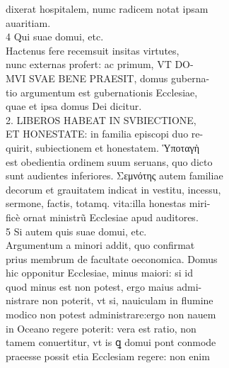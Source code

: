 \documentclass{article}
\begin{document}
\begin{pages}
                dixerat hospitalem, numc radicem notat ipsam \\
                auaritiam. \\
                4 Qui suae domui, etc. \\
                Hactenus fere recemsuit insitas virtutes, \\
                nunc externas profert: ac primum, VT DO- \\
                MVI SVAE BENE PRAESIT, domus guberna- \\
                tio argumentum est gubernationis Ecclesiae, \\
                quae et ipsa domus Dei dicitur. \\
                2. LIBEROS HABEAT IN SVBIECTIONE, \\
                ET HONESTATE: in familia episcopi duo re- \\
                quirit, subiectionem et honestatem. Ὑποταγὴ \\
                est obedientia ordinem suum seruans, quo dicto \\
                sunt audientes inferiores. Σεμνότης autem familiae \\
                decorum et grauitatem indicat in vestitu, incessu, \\
                sermone, factis, totamq. vita:illa honestas miri- \\
                ficè ornat ministrũ Ecclesiae apud auditores. \\
                5 Si autem quis suae domui, etc. \\
                Argumentum a minori addit, quo confirmat \\
                prius membrum de facultate oeconomica. Domus \\
                hic opponitur Ecclesiae, minus maiori: si id \\
                quod minus est non potest, ergo maius admi- \\
                nistrare non poterit, vt si, nauiculam in flumine \\
                modico non potest administrare:ergo non nauem \\
                in Oceano regere poterit: vera est ratio, non \\
                tamem conuertitur, vt is ꝗ domui pont conmode \\
                praeesse possit etia Ecclesiam regere: non enim \\

\end{pages}
\end{document}
